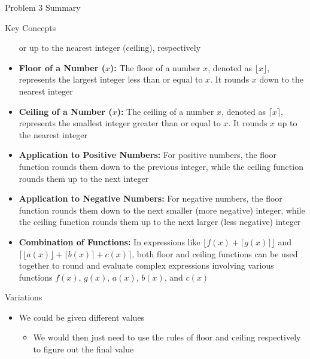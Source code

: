 \begin{summary}{Problem 3 Summary}
\begin{statement}{Key Concepts}
\begin{itemize}
            or up to the nearest integer (ceiling), respectively
            \item \textbf{Floor of a Number ($x$):} The floor of a number $x$, denoted as $\lfloor x \rfloor$, represents the largest integer less than or equal to $x$. It rounds $x$ down to the nearest integer
            \item \textbf{Ceiling of a Number ($x$):} The ceiling of a number $x$, denoted as $\lceil x \rceil$, represents the smallest integer greater than or equal to $x$. It rounds $x$ up to the nearest integer
            \item \textbf{Application to Positive Numbers:} For positive numbers, the floor function rounds them down to the previous integer, while the ceiling function rounds them up to the next integer
            \item \textbf{Application to Negative Numbers:} For negative numbers, the floor function rounds them down to the next smaller (more negative) integer, while the ceiling function rounds them up to the 
            next larger (less negative) integer
            \item \textbf{Combination of Functions:} In expressions like $\lfloor f(x) + \lceil g(x) \rceil \rfloor$ and $\lceil \lfloor a(x) \rfloor + \lceil b(x) \rceil + c(x) \rceil$, both floor and ceiling 
            functions can be used together to round and evaluate complex expressions involving various functions $f(x)$, $g(x)$, $a(x)$, $b(x)$, and $c(x)$
        \end{itemize}
    \end{statement}
    \begin{statement}{Variations}
        \begin{itemize}
            \item We could be given different values
            \begin{itemize}
                \item We would then just need to use the rules of floor and ceiling respectively to figure out the final value
            \end{itemize}
        \end{itemize}
    \end{statement}
\end{summary}

